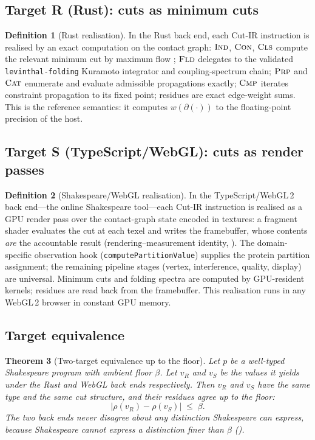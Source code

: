 \documentclass[11pt,a4paper]{article}
\theoremstyle{thmstyle}
\newtheorem{theorem}{Theorem}[section]
\theoremstyle{definition}
\newtheorem{definition}[theorem]{Definition}
\theoremstyle{remark}
\newcommand{\flo}{\beta}
\newcommand{\res}{\rho}
\newcommand{\cut}{\partial}
\newcommand{\shk}[1]{\texttt{#1}}
\newcommand{\abs}[1]{\lvert#1\rvert}
\begin{document}
\subsection{Target R (Rust): cuts as minimum cuts}

\begin{definition}[Rust realisation]
\label{def:rust-target}
In the Rust back end, each Cut-IR instruction is realised by an exact
computation on the contact graph: $\textsc{Ind}$, $\textsc{Con}$,
$\textsc{Cls}$ compute the relevant minimum cut by maximum flow
\citep{fordfulkerson1956,cormen2009}; $\textsc{Fld}$ delegates to the
validated \shk{levinthal-folding} Kuramoto integrator and coupling-spectrum
chain; $\textsc{Prp}$ and $\textsc{Cat}$ enumerate and evaluate admissible
propagations exactly; $\textsc{Cmp}$ iterates constraint propagation to its
fixed point; residues are exact edge-weight sums. This is the reference
semantics: it computes $w(\cut(\cdot))$ to the floating-point precision of
the host.
\end{definition}

\subsection{Target S (TypeScript/WebGL): cuts as render passes}

\begin{definition}[Shakespeare/WebGL realisation]
\label{def:ts-target}
In the TypeScript/WebGL\,2 back end---the online Shakespeare tool---each
Cut-IR instruction is realised as a GPU render pass over the contact-graph
state encoded in textures: a fragment shader evaluates the cut at each
texel and writes the framebuffer, whose contents \emph{are} the accountable
result (rendering--measurement identity, \citealt{sachikonye2025sbs}). The
domain-specific observation hook (\shk{computePartitionValue}) supplies the
protein partition assignment; the remaining pipeline stages (vertex,
interference, quality, display) are universal. Minimum cuts and folding
spectra are computed by GPU-resident kernels; residues are read back from
the framebuffer. This realisation runs in any WebGL\,2 browser in constant
GPU memory.
\end{definition}

\subsection{Target equivalence}

\begin{theorem}[Two-target equivalence up to the floor]
\label{thm:target-equiv}
Let $p$ be a well-typed Shakespeare program with ambient floor $\flo$. Let
$v_R$ and $v_S$ be the values it yields under the Rust and WebGL back ends
respectively. Then $v_R$ and $v_S$ have the same type and the same cut
structure, and their residues agree up to the floor:
\[
\abs{\res(v_R)-\res(v_S)}\;\le\;\flo .
\]
The two back ends never disagree about any distinction Shakespeare can
express, because Shakespeare cannot express a distinction finer than $\flo$
().
\end{theorem}
\end{document}
